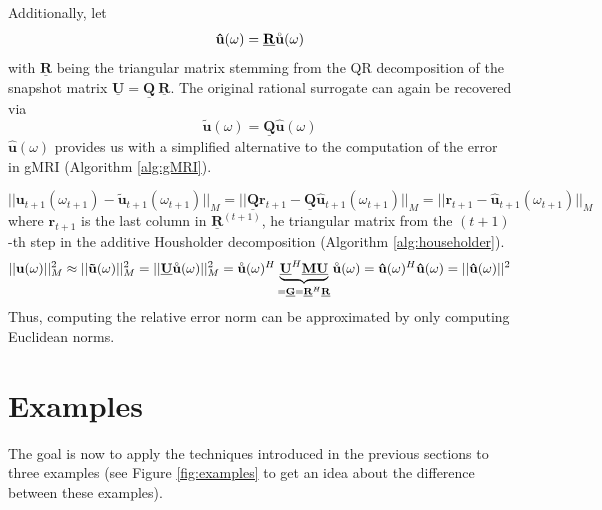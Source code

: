 \documentclass[11pt, a4paper]{article}
\begin{document}
Additionally, let
\begin{equation}
    \mathbf{\hat{u}}(\omega) = \mathbf{\underline{R}} \accentset{\circ}{\mathbf{u}}(\omega) \label{equ:u-hat}
\end{equation}
with $\mathbf{\underline{R}}$ being the triangular matrix stemming from the QR decomposition 
of the snapshot matrix $\mathbf{\underline{U}} = \mathbf{\underline{Q}} ~ \mathbf{\underline{R}}$.
The original rational surrogate can again be recovered via
\begin{equation}
    \mathbf{\tilde{u}}(\omega) = \mathbf{\underline{Q}} \mathbf{\hat{u}}(\omega)
\end{equation}
$\mathbf{\hat{u}}(\omega)$ provides us with a simplified alternative to the
computation of the error in \acrshort{gMRI} (Algorithm \ref{alg:gMRI}).

\begin{equation}
    ||\mathbf{u}_{t+1}(\omega_{t+1}) - \mathbf{\tilde{u}}_{t+1}(\omega_{t+1})||_M
    = ||\mathbf{\underline{Q}} \mathbf{r}_{t+1} - \mathbf{\underline{Q}}\mathbf{\hat{u}}_{t+1}(\omega_{t+1})||_M
    = ||\mathbf{r}_{t+1} - \mathbf{\hat{u}}_{t+1}(\omega_{t+1})||_M
\end{equation}
where $\mathbf{r}_{t+1}$ is the last column in $\mathbf{\underline{R}}^{(t+1)}$,
he triangular matrix from the $(t+1)$-th step in the additive Housholder decomposition
(Algorithm \ref{alg:householder}).
\begin{equation}
    ||\mathbf{u}(\omega)||_M^2 \approx ||\mathbf{\tilde{u}}(\omega)||_M^2
    = ||\mathbf{\underline{U}} \accentset{\circ}{\mathbf{u}}(\omega)||_M^2
    = \accentset{\circ}{\mathbf{u}}(\omega)^H \underbrace{\mathbf{\underline{U}}^H \mathbf{\underline{M}} \mathbf{\underline{U}}}_{= \mathbf{\underline{G}} = \mathbf{\underline{R}}^H \mathbf{\underline{R}}} \accentset{\circ}{\mathbf{u}}(\omega)
    = \mathbf{\hat{u}}(\omega)^H \mathbf{\hat{u}}(\omega)
    = ||\mathbf{\hat{u}}(\omega)||^2
\end{equation}
Thus, computing the relative error norm can be approximated by only computing
Euclidean norms.

\newpage
\section{Examples}
\label{sec:examples}

The goal is now to apply the techniques introduced in the previous sections
to three examples (see Figure \ref{fig:examples} to get an idea about the
difference between these examples).
\end{document}
